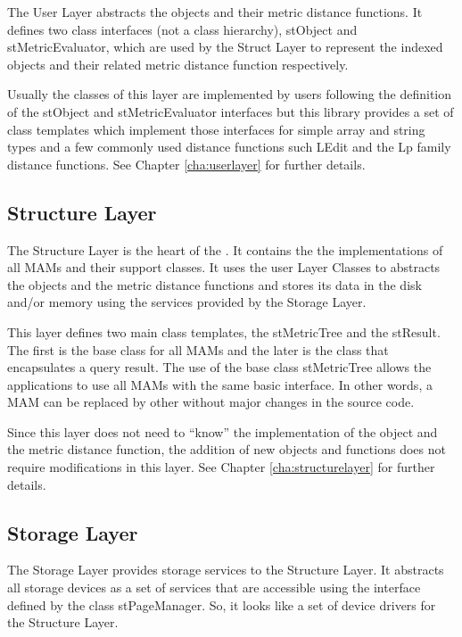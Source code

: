 The User Layer abstracts the objects and their metric distance functions. It defines two class interfaces (not a class hierarchy), stObject and stMetricEvaluator, which are used by the Struct Layer to represent the indexed objects and their related metric distance function respectively.

Usually the classes of this layer are implemented by users following the definition of the stObject and stMetricEvaluator interfaces but this library provides a set of class templates which implement those interfaces for simple array and string types and a few commonly used distance functions such LEdit \cite{?} and the Lp family \cite{} distance functions. See Chapter \ref{cha:userlayer} for further details.

\subsection{Structure Layer}
\label{sec:arch.struct}

The Structure Layer is the heart of the \libname. It contains the the implementations of all MAMs and their support classes. It uses the user Layer Classes to abstracts the objects and the metric distance functions and stores its data in the disk and/or memory using the services provided by the Storage Layer.

This layer defines two main class templates, the stMetricTree and the stResult. The first is the base class for all MAMs and the later is the class that encapsulates a query result. The use of the base class stMetricTree allows the applications to use all MAMs with the same basic interface. In other words, a MAM can be replaced by other without major changes in the source code.

Since this layer does not need to ``know'' the implementation of the object and the metric distance function, the addition of new objects and functions does not require modifications in this layer. See Chapter \ref{cha:structurelayer} for further details.

\subsection{Storage Layer}
\label{sec:arch.storage}

The Storage Layer provides storage services to the Structure Layer. It abstracts all storage devices as a set of services that are accessible using the interface defined by the class stPageManager. So, it looks like a set of device drivers for the Structure Layer.

